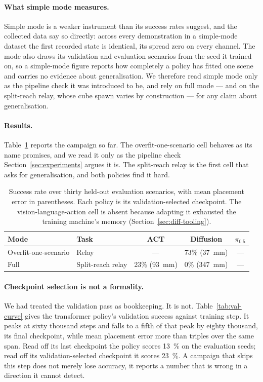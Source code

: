 \paragraph{What simple mode measures.}
Simple mode is a weaker instrument than its success rates suggest, and
the collected data say so directly: across every demonstration in a
simple-mode dataset the first recorded state is identical, its spread
zero on every channel. The mode also draws its validation and
evaluation scenarios from the seed it trained on, so a simple-mode
figure reports how completely a policy has fitted one scene and carries
no evidence about generalisation. We therefore read simple mode only as
the pipeline check it was introduced to be, and rely on full mode --- and
on the split-reach relay, whose cube spawn varies by construction --- for
any claim about generalisation.

\paragraph{Results.}
Table~\ref{tab:sim-results} reports the campaign so far. The
overfit-one-scenario cell behaves as its name promises, and we read it only
as the pipeline check Section~\ref{sec:experiments} argues it is. The
split-reach relay is the first cell that asks for generalisation, and both
policies find it hard.

\begin{table}[t]
\centering
\small
\begin{tabular}{llccc}
\toprule
Mode & Task & ACT & Diffusion & $\pi_{0.5}$ \\
\midrule
Overfit-one-scenario & Relay          & --- & 73\% (\SI{37}{\mm}) & --- \\
Full                 & Split-reach relay & 23\% (\SI{93}{\mm}) & 0\% (\SI{347}{\mm}) & --- \\
\bottomrule
\end{tabular}
\caption{Success rate over thirty held-out evaluation scenarios, with mean
placement error in parentheses. Each policy is its validation-selected
checkpoint. The vision-language-action cell is absent because adapting it
exhausted the training machine's memory (Section~\ref{sec:diff-tooling}).}
\label{tab:sim-results}
\end{table}

\paragraph{Checkpoint selection is not a formality.}
We had treated the validation pass as bookkeeping. It is not. Table~\ref{tab:val-curve}
gives the transformer policy's validation success against training step. It
peaks at sixty thousand steps and falls to a fifth of that peak by eighty
thousand, its final checkpoint, while mean placement error more than triples
over the same span. Read off its last checkpoint the policy scores
\SI{13}{\percent} on the evaluation seeds; read off its validation-selected
checkpoint it scores \SI{23}{\percent}. A campaign that skips this step does
not merely lose accuracy, it reports a number that is wrong in a direction it
cannot detect.

